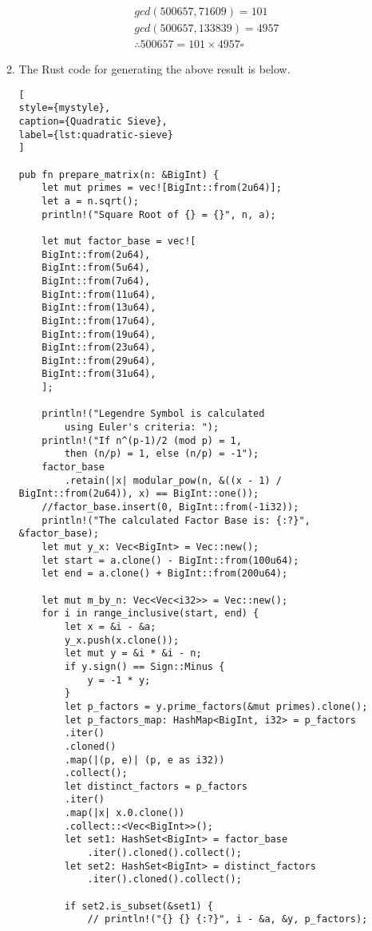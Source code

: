 \documentclass[11pt,a4paper,fleqn]{article}
\begin{document}
\begin{enumerate}[1.]
\begin{flushleft}
\begin{enumerate}[Step 1.]
\begin{align*}
                    & gcd(500657, 71609) = 101 \\
                    & gcd(500657, 133839) = 4957\\\
                    &   \therefore 500657 = 101 \times 4957 \square
                \end{align*}
                \item The Rust code for generating the above result is below.
                \begin{lstlisting}[
style={mystyle},
caption={Quadratic Sieve},
label={lst:quadratic-sieve}
]

pub fn prepare_matrix(n: &BigInt) {
    let mut primes = vec![BigInt::from(2u64)];
    let a = n.sqrt();
    println!("Square Root of {} = {}", n, a);

    let mut factor_base = vec![
    BigInt::from(2u64),
    BigInt::from(5u64),
    BigInt::from(7u64),
    BigInt::from(11u64),
    BigInt::from(13u64),
    BigInt::from(17u64),
    BigInt::from(19u64),
    BigInt::from(23u64),
    BigInt::from(29u64),
    BigInt::from(31u64),
    ];

    println!("Legendre Symbol is calculated
        using Euler's criteria: ");
    println!("If n^(p-1)/2 (mod p) = 1,
        then (n/p) = 1, else (n/p) = -1");
    factor_base
        .retain(|x| modular_pow(n, &((x - 1) / BigInt::from(2u64)), x) == BigInt::one());
    //factor_base.insert(0, BigInt::from(-1i32));
    println!("The calculated Factor Base is: {:?}", &factor_base);
    let mut y_x: Vec<BigInt> = Vec::new();
    let start = a.clone() - BigInt::from(100u64);
    let end = a.clone() + BigInt::from(200u64);

    let mut m_by_n: Vec<Vec<i32>> = Vec::new();
    for i in range_inclusive(start, end) {
        let x = &i - &a;
        y_x.push(x.clone());
        let mut y = &i * &i - n;
        if y.sign() == Sign::Minus {
            y = -1 * y;
        }
        let p_factors = y.prime_factors(&mut primes).clone();
        let p_factors_map: HashMap<BigInt, i32> = p_factors
        .iter()
        .cloned()
        .map(|(p, e)| (p, e as i32))
        .collect();
        let distinct_factors = p_factors
        .iter()
        .map(|x| x.0.clone())
        .collect::<Vec<BigInt>>();
        let set1: HashSet<BigInt> = factor_base
            .iter().cloned().collect();
        let set2: HashSet<BigInt> = distinct_factors
            .iter().cloned().collect();

        if set2.is_subset(&set1) {
            // println!("{} {} {:?}", i - &a, &y, p_factors);


\end{lstlisting}
\end{enumerate}
\end{flushleft}
\end{enumerate}
\end{document}
